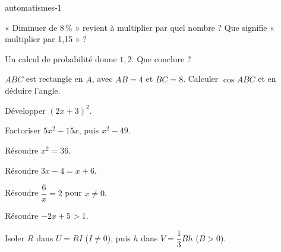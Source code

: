 \begin{blocEdition}{automatismes-1}
\begin{deuxcolonnes}
\begin{questions}
\item \begin{minipage}[t]{\linewidth}\raggedright\leavevmode « Diminuer de 8\,\% » revient à multiplier par quel nombre ? Que signifie « multiplier par 1,15 » ?\end{minipage}
\item \begin{minipage}[t]{\linewidth}\raggedright\leavevmode Un calcul de probabilité donne $1{,}2$. Que conclure ?\end{minipage}
\item \begin{minipage}[t]{\linewidth}\raggedright\leavevmode $ABC$ est rectangle en $A$, avec $AB=4$ et $BC=8$. Calculer $\cos\widehat{ABC}$ et en déduire l’angle.\end{minipage}
\end{questions}\end{deuxcolonnes}
\begin{deuxcolonnes}\begin{questions}
\item \begin{minipage}[t]{\linewidth}\raggedright\leavevmode Développer $(2x+3)^2$.\end{minipage}
\item \begin{minipage}[t]{\linewidth}\raggedright\leavevmode Factoriser $5x^2-15x$, puis $x^2-49$.\end{minipage}
\item \begin{minipage}[t]{\linewidth}\raggedright\leavevmode Résoudre $x^2=36$.\end{minipage}
\item \begin{minipage}[t]{\linewidth}\raggedright\leavevmode Résoudre $3x-4=x+6$.\end{minipage}
\item \begin{minipage}[t]{\linewidth}\raggedright\leavevmode Résoudre $\dfrac6x=2$ pour $x\ne0$.\end{minipage}
\item \begin{minipage}[t]{\linewidth}\raggedright\leavevmode Résoudre $-2x+5>1$.\end{minipage}
\item \begin{minipage}[t]{\linewidth}\raggedright\leavevmode Isoler $R$ dans $U=RI$ ($I\ne0$), puis $h$ dans $V=\dfrac13Bh$ ($B>0$).\end{minipage}

\end{questions}
\end{deuxcolonnes}
\end{blocEdition}
